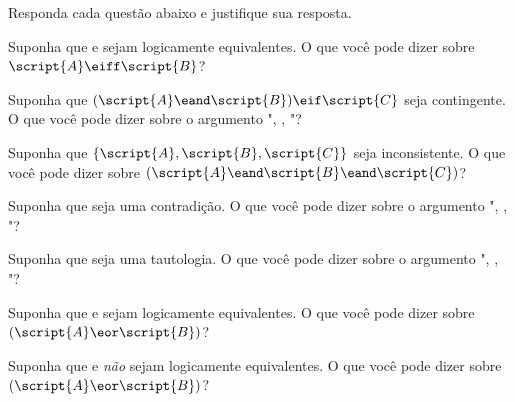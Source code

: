 \solutions
\problempart
\label{pr.TT.concepts}
Responda cada questão abaixo e justifique sua resposta.
\begin{earg}
\item Suponha que  e  sejam logicamente equivalentes. O que você pode dizer sobre $\script{A}\eiff\script{B}$?
\item Suponha que $(\script{A}\eand\script{B})\eif\script{C}$ seja contingente. O que você pode dizer sobre o argumento ", , \therefore{}"?
\item Suponha que $\{\script{A},\script{B}, \script{C}\}$ seja inconsistente. O que você pode dizer sobre $(\script{A}\eand\script{B}\eand\script{C})$?
\item Suponha que  seja uma contradição. O que você pode dizer sobre o argumento ", , \therefore{}"?
\item Suponha que  seja uma tautologia. O que você pode dizer sobre o argumento ", , \therefore{}"?
\item Suponha que  e  sejam logicamente equivalentes. O que você pode dizer sobre $(\script{A}\eor\script{B})$?
\item Suponha que  e  \emph{não} sejam logicamente equivalentes. O que você pode dizer sobre $(\script{A}\eor\script{B})$?
\end{earg}

